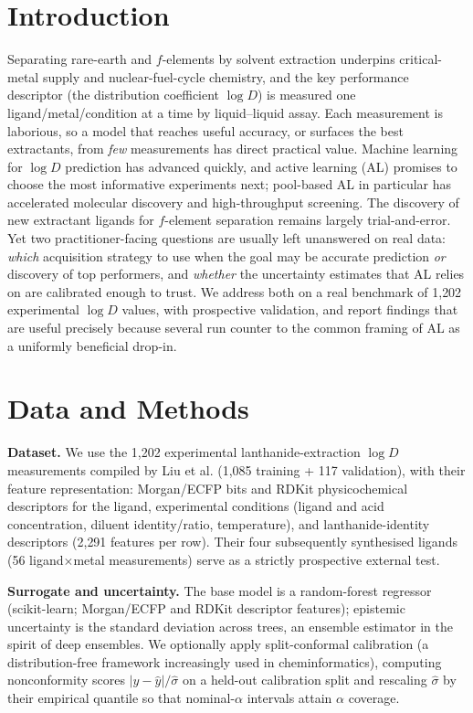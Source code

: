 \documentclass[journal=acsodf,manuscript=article]{achemso}
\begin{document}
\section{Introduction}
Separating rare-earth and $f$-elements by solvent extraction underpins critical-metal
supply and nuclear-fuel-cycle chemistry, and the key performance descriptor (the
distribution coefficient $\log D$) is measured one ligand/metal/condition at a time
by liquid--liquid assay. Each measurement is laborious, so a model that reaches useful
accuracy, or surfaces the best extractants, from \emph{few} measurements has direct
practical value. Machine learning for $\log D$ prediction has advanced
quickly,\cite{Liu_2022,Tetko_2025} and active learning
(AL)\cite{Settles_2009,Reker_2015} promises to choose the most informative
experiments next; pool-based AL in particular has accelerated molecular discovery
and high-throughput screening.\cite{Smith_2018,Graff_2021,Dodds_2024,Antoniuk_2026}
The discovery of new extractant ligands for $f$-element separation remains largely
trial-and-error.\cite{Panak_2013} Yet two practitioner-facing questions are usually left
unanswered on real data: \emph{which} acquisition strategy to use when the goal may be
accurate prediction \emph{or} discovery of top performers, and \emph{whether} the
uncertainty estimates that AL relies on are calibrated enough to trust. We address both
on a real benchmark of 1{,}202 experimental $\log D$ values, with prospective
validation, and report findings that are useful precisely because several run counter
to the common framing of AL as a uniformly beneficial drop-in.

\section{Data and Methods}
\textbf{Dataset.} We use the 1{,}202 experimental lanthanide-extraction $\log D$
measurements compiled by Liu et al.\cite{Liu_2022} (1{,}085 training + 117 validation),
with their feature representation: Morgan/ECFP bits and RDKit physicochemical
descriptors for the ligand, experimental conditions (ligand and acid concentration,
diluent identity/ratio, temperature), and lanthanide-identity descriptors
(2{,}291 features per row). Their four subsequently synthesised ligands
(56 ligand$\times$metal measurements) serve as a strictly prospective external test.

\textbf{Surrogate and uncertainty.} The base model is a random-forest
regressor\cite{Breiman_2001} (scikit-learn\cite{Pedregosa_2011}; Morgan/ECFP and
RDKit descriptor features\cite{Rogers_2010,RDKit}); epistemic uncertainty is the
standard deviation across trees, an ensemble estimator in the spirit of deep
ensembles.\cite{Lakshminarayanan_2017,Scalia_2020,Hirschfeld_2020} We optionally
apply split-conformal calibration\cite{Vovk_2005,Lei_2018,Angelopoulos_2023} (a
distribution-free framework increasingly used in
cheminformatics\cite{Norinder_2014,Arvidsson_McShane_2024}), computing nonconformity
scores $|y-\hat{y}|/\hat\sigma$ on a held-out calibration split and rescaling
$\hat\sigma$ by their empirical quantile so that nominal-$\alpha$ intervals attain
$\alpha$ coverage.
\end{document}
